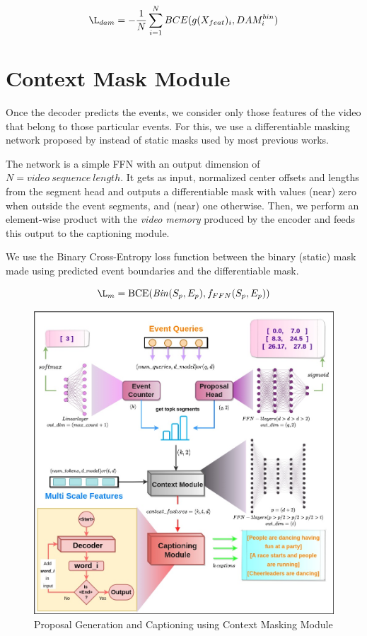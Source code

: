 $$\L_{dam} = -\frac{1}{N}\displaystyle\sum\limits_{i=1}^N BCE(g(X_{feat})_i, DAM^{bin}_i)$$


\section{Context Mask Module}
\par Once the decoder predicts the events, we consider only those features of the video that belong to those particular events. For this, we use a differentiable masking network proposed by \cite{endtoend} instead of static masks used by most previous works.
\par The network is a simple FFN with an output dimension of $N=video \ sequence \ length$. It gets as input, normalized center offsets and lengths from the segment head and outputs a differentiable mask with values (near) zero when outside the event segments, and (near) one otherwise. Then, we perform an element-wise product with the \textit{video memory} produced by the encoder and feeds this output to the captioning module.
\par We use the Binary Cross-Entropy loss function between the binary (static) mask made using predicted event boundaries and the differentiable mask.

$$\L_{m} = \textrm{BCE}(\mathit{Bin}(S_{p}, E_{p}), f_{FFN}(S_{p}, E_{p}))$$


\begin{figure} [H]
	\centering
	\includegraphics[width=\linewidth]{assets/img/architecture-2.jpeg}
	\caption{Proposal Generation and Captioning using Context Masking Module} %
\end{figure}



